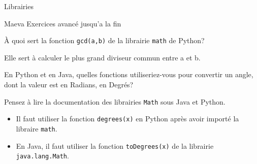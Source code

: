 \begin{section}{Librairies}
\begin{conseil}
\begin{note}{Maeva}
    Exercices avancé jusqu'a la fin
\end{note}
\end{conseil} 
\begin{Exercice}[3 minutes]
	À quoi sert la fonction \lstinline{gcd(a,b)} de la librairie \lstinline{math} de Python? 
\end{Exercice} 
\begin{solution}
	Elle sert à calculer le plus grand diviseur commun entre a et b.
\end{solution} 
\begin{Exercice}[3 minutes]
    En Python et en Java, quelles fonctions utiliseriez-vous pour convertir un angle, dont la valeur est en Radians, en Degrés? 
\end{Exercice}
\begin{conseil}
    Pensez à lire la documentation des librairies \lstinline{Math} sous Java et Python.
\end{conseil}
\begin{solution}
    \begin{itemize}
        \item Il faut utiliser la fonction \lstinline{degrees(x)} en Python après avoir importé la libraire \lstinline{math}.
        \item En Java, il faut utiliser la fonction \lstinline{toDegrees(x)} de la librairie \lstinline{java.lang.Math}.
    \end{itemize}


\end{solution}
\end{section}
